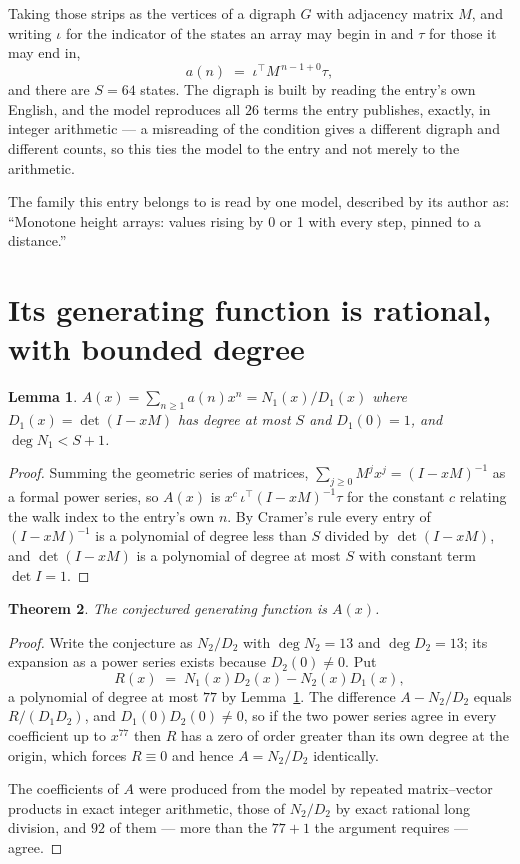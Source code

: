 \documentclass[11pt,a4paper]{article}
\theoremstyle{plain}
\newtheorem{theorem}{Theorem}
\newtheorem{lemma}[theorem]{Lemma}
\theoremstyle{definition}
\begin{document}
Taking those strips as the vertices of a digraph $G$ with adjacency matrix $M$, and writing
$\iota$ for the indicator of the states an array may begin in and $\tau$ for those it may end
in,
\[
a(n)\;=\;\iota^{\!\top}M^{\,n-1+0}\tau ,
\]
and there are $S=64$ states. The digraph is built by reading the entry's own English, and the
model reproduces all $26$ terms the entry publishes, exactly, in integer arithmetic --- a
misreading of the condition gives a different digraph and different counts, so this ties the
model to the entry and not merely to the arithmetic.

The family this entry belongs to is read by one model, described by its author as: ``Monotone height arrays: values rising by 0 or 1 with every step, pinned to a distance.''


\section{Its generating function is rational, with bounded degree}

\begin{lemma}\label{lem:rat}
$A(x)=\sum_{n\ge1}a(n)x^n=N_1(x)/D_1(x)$ where $D_1(x)=\det(I-xM)$ has degree at most
$S$ and $D_1(0)=1$, and $\deg N_1<S+1$.
\end{lemma}

\begin{proof}
Summing the geometric series of matrices, $\sum_{j\ge0}M^jx^j=(I-xM)^{-1}$ as a formal
power series, so $A(x)$ is $x^{c}\,\iota^{\!\top}(I-xM)^{-1}\tau$ for the constant $c$
relating the walk index to the entry's own $n$. By Cramer's rule every entry of
$(I-xM)^{-1}$ is a polynomial of degree less than $S$ divided by $\det(I-xM)$, and
$\det(I-xM)$ is a polynomial of degree at most $S$ with constant term $\det I=1$.
\end{proof}

\begin{theorem}
The conjectured generating function is $A(x)$.
\end{theorem}

\begin{proof}
Write the conjecture as $N_2/D_2$ with $\deg N_2=13$ and $\deg D_2=13$; its expansion as a
power series exists because $D_2(0)\neq0$. Put
\[
R(x)\;=\;N_1(x)D_2(x)-N_2(x)D_1(x),
\]
a polynomial of degree at most $77$ by Lemma~\ref{lem:rat}. The difference
$A-N_2/D_2$ equals $R/(D_1D_2)$, and $D_1(0)D_2(0)\neq0$, so if the two power series agree in
every coefficient up to $x^{77}$ then $R$ has a zero of order greater than its own
degree at the origin, which forces $R\equiv0$ and hence $A=N_2/D_2$ identically.

The coefficients of $A$ were produced from the model by repeated matrix--vector products in
exact integer arithmetic, those of $N_2/D_2$ by exact rational long division, and $92$
of them --- more than the $77+1$ the argument requires --- agree.
\end{proof}
\end{document}
